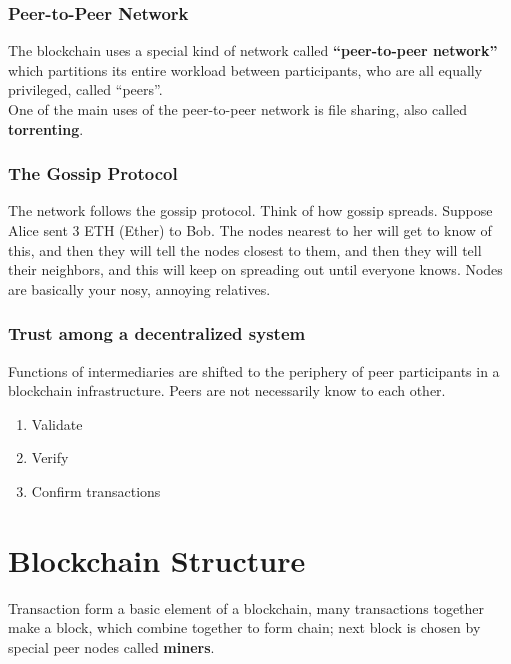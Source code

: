 \documentclass{article}
\begin{document}
\subsubsection{Peer-to-Peer Network}
The blockchain uses a special kind of network called \textbf{“peer-to-peer network”} which partitions its entire workload between participants, who are all equally privileged, called “peers”. \\
One of the main uses of the peer-to-peer network is file sharing, also called \textbf{torrenting}.

\subsubsection{The Gossip Protocol}
The network follows the gossip protocol. Think of how gossip spreads. Suppose Alice sent 3 ETH (Ether) to Bob. The nodes nearest to her will get to know of this, and then they will tell the nodes closest to them, and then they will tell their neighbors, and this will keep on spreading out until everyone knows. Nodes are basically your nosy, annoying relatives.

\subsubsection{Trust among a decentralized system}
Functions of intermediaries are shifted to the periphery of peer participants in a blockchain infrastructure. Peers are not necessarily know to each other. 
\begin{enumerate}
    \item Validate \vspace{-0.5em}
    \item Verify \vspace{-0.5em}
    \item Confirm transactions \vspace{-0.5em}
\end{enumerate}

\section{Blockchain Structure}
Transaction form a basic element of a blockchain, many transactions together make a block, which combine together to form chain; next block is chosen by special peer nodes called \textbf{miners}.
\end{document}
